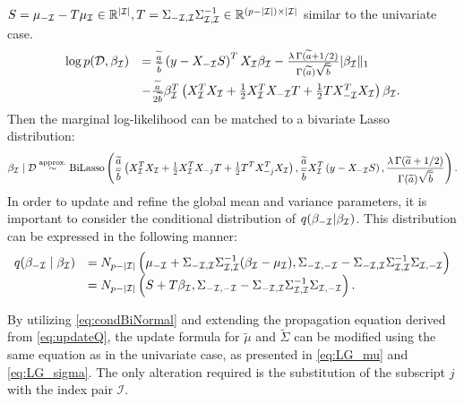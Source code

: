 $S =  \mu_{-{\mathcal I}} - T \mu_{\mathcal I} \in \mathbb{R}^{|{\mathcal I}|},
T = \Sigma_{-{\mathcal I},{\mathcal I}} \Sigma_{{\mathcal I},{\mathcal I}}^{-1} \in \mathbb{R}^{(p - |{\mathcal I}|)\times|{\mathcal I}|}
$ similar to the univariate case.
\begin{equation}
	\begin{array}{rl} 
		\log p(\mathcal{D},\beta_{\mathcal I}) 
		&   =  \frac{\widetilde{a}}{\widetilde{b}} \left( y - X_{-{\mathcal I}}S \right)^T X_{\mathcal I} \beta_{\mathcal I}
		- \frac{\lambda\,\Gamma(\widetilde{a}+1/2)}{\Gamma(\widetilde{a})\sqrt{\widetilde{b}}} |\beta_{\mathcal I}\|_1
		\\ [2ex]
		& 
		- \frac{\widetilde{a}}{2\widetilde{b}} \beta_{\mathcal I}^T \left( X_{\mathcal I}^TX_{\mathcal I} + \tfrac{1}{2}X_{\mathcal I}^TX_{-{\mathcal I}}T 
		+ \tfrac{1}{2}T X_{-{\mathcal I}}^TX_{\mathcal I}
		\right)\beta_{\mathcal I}.
	\end{array}
\end{equation}
Then the marginal log-likelihood can be matched to a bivariate Lasso distribution:\\
\begin{equation}
	\beta_{{\mathcal I}}\mid\mathcal{D} 
	\stackrel{\mbox{\scriptsize approx.}}{\sim} 
	\mbox{BiLasso}\left(
	\frac{\widetilde{a}}{\widetilde{b}} \left(X_{\mathcal I}^TX_{\mathcal I} + \tfrac{1}{2}X_{\mathcal I}^TX_{-j}T + \tfrac{1}{2}T^T X_{-j}^T X_{\mathcal I} \right),
	\frac{\widetilde{a}}{\widetilde{b}} X_{\mathcal I}^T\left( y - X_{-{\mathcal I}}S \right),
	\frac{\lambda\,\Gamma(\widetilde{a}+1/2)}{\Gamma(\widetilde{a})\sqrt{\widetilde{b}}} 
	\right).
\end{equation}
In order to update and refine the global mean and variance parameters, it is important to consider the conditional distribution of $q(\beta_{-{\mathcal I}}|\beta_{\mathcal I})$. This distribution can be expressed in the following manner:
\begin{equation}
	\begin{array}{rl}
		q(\beta_{-{\mathcal I}}\mid\beta_{\mathcal I}) 
		& = N_{p-|{\mathcal I}|}\left( \mu_{-{\mathcal I}} +\Sigma_{-{\mathcal I},{\mathcal I}} \Sigma_{{\mathcal I},{\mathcal I}}^{-1}(\beta_{\mathcal I} - \mu_{\mathcal I}), \Sigma_{-{\mathcal I},-{\mathcal I}} - \Sigma_{-{\mathcal I},{\mathcal I}}\Sigma_{{\mathcal I},{\mathcal I}}^{-1}\Sigma_{{\mathcal I},-{\mathcal I}}  \right)
		\\ 
		& = N_{p-|{\mathcal I}|}\left( S  + T \beta_{{\mathcal I}}, \Sigma_{-{\mathcal I},-{\mathcal I}} - \Sigma_{-{\mathcal I},{\mathcal I}}\Sigma_{{\mathcal I},{\mathcal I}}^{-1}\Sigma_{{\mathcal I},-{\mathcal I}}  \right).
	\end{array}
	\label{eq:condBiNormal}
\end{equation}

By utilizing \autoref{eq:condBiNormal} and extending the propagation equation derived from \autoref{eq:updateQ}, the update formula for $\tilde{\mu}$ and $\tilde{\Sigma}$ can be modified using the same equation as in the univariate case, as presented in \autoref{eq:LG_mu} and \autoref{eq:LG_sigma}. The only alteration required is the substitution of the subscript $j$ with the index pair $\mathcal{I}$.

